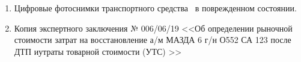 \begin{enumerate}\item Цифровые фотоснимки
транспортного средства  \, в поврежденном состоянии.\\[-2mm]
\item Копия экспертного заключения № 006/06/19 <<Об определении рыночной стоимости затрат на восстановление а/м МАЗДА 6 г/н О552 СА 123 после ДТП иутраты товарной стоимости (УТС) >>\\ [-2mm]
	\end{enumerate}
%

